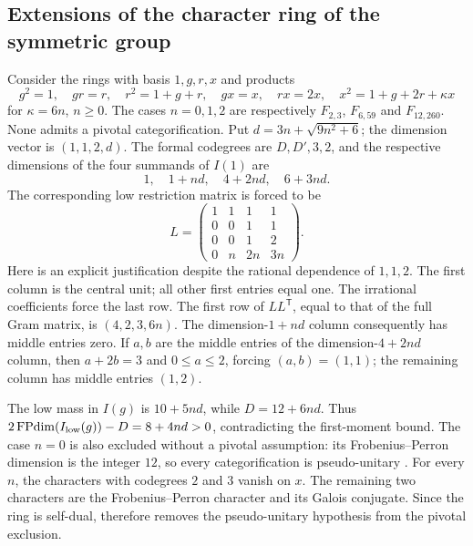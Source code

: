 \subsection{Extensions of the character ring of the symmetric group}\label{sec:near-s3}
Consider the rings with basis $1,g,r,x$ and products
\[
 g^2=1,\quad gr=r,\quad r^2=1+g+r,\quad gx=x,\quad rx=2x,
 \quad x^2=1+g+2r+\kappa x
\]
for $\kappa=6n$, $n\geq0$. The cases $n=0,1,2$ are respectively
$F_{2,3}$, $F_{6,59}$ and $F_{12,260}$.
None admits a pivotal categorification. Put $d=3n+\sqrt{9n^2+6}$;
the dimension vector is $(1,1,2,d)$. The formal codegrees are
$D,D',3,2$, and the respective dimensions of the four summands of $I(1)$ are
\[
 1,\quad 1+nd,\quad 4+2nd,\quad 6+3nd.
\]
The corresponding low restriction matrix is forced to be
\[
 L=\begin{pmatrix}1&1&1&1\\0&0&1&1\\0&0&1&2\\0&n&2n&3n\end{pmatrix}.
\]
Here is an explicit justification despite the rational dependence of $1,1,2$.
The first column is the central unit; all other first entries equal one.
The irrational coefficients force the last row. The first row of
$LL^{\mathsf T}$, equal to that of the full Gram matrix, is
$(4,2,3,6n)$. The dimension-$1+nd$ column consequently has middle entries
zero. If $a,b$ are the middle entries of the dimension-$4+2nd$ column, then
$a+2b=3$ and $0\leq a\leq2$, forcing $(a,b)=(1,1)$; the remaining
column has middle entries $(1,2)$.

The low mass in $I(g)$ is $10+5nd$, while
$D=12+6nd$. Thus $2\operatorname{FPdim}(I_{\rm low}(g))-D=8+4nd>0$, contradicting
the first-moment bound. The case $n=0$ is also excluded without a pivotal
assumption: its Frobenius--Perron dimension is the integer $12$, so every
categorification is pseudo-unitary \cite[Proposition~8.24]{ENO}.
For every $n$, the characters with codegrees $2$ and $3$ vanish on $x$.
The remaining two characters are the Frobenius--Perron character and its
Galois conjugate. Since the ring is self-dual, \cite[Lemma~\ref{B-lem:galois}]{Finite}
therefore removes the pseudo-unitary hypothesis from the pivotal exclusion.
